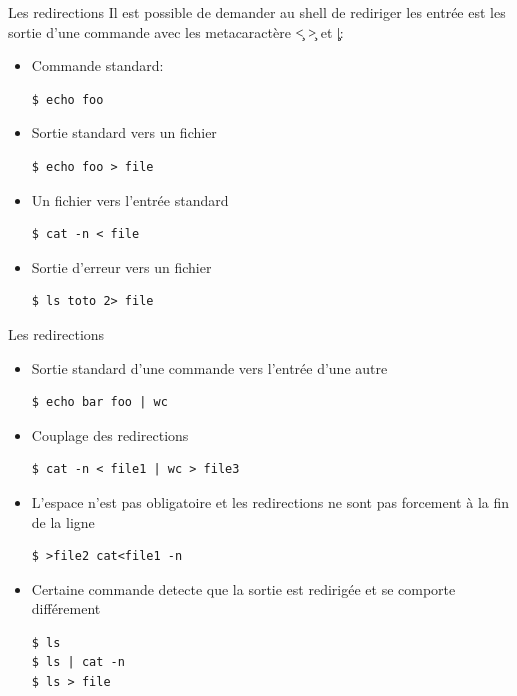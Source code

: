 \begin{frame}[fragile=singleslide]{Les redirections}
  Il est possible de demander au shell de rediriger les entrée est les
  sortie d'une commande avec les metacaractère \c{<} \c{>} et \c{|}:
  \begin{itemize}
  \item Commande standard:
    \begin{lstlisting}
$ echo foo
    \end{lstlisting}
  \item Sortie standard vers un fichier
    \begin{lstlisting}
$ echo foo > file
    \end{lstlisting}
  \item Un fichier vers l'entrée standard
    \begin{lstlisting}
$ cat -n < file
    \end{lstlisting} %
  \item Sortie d'erreur vers un fichier
    \begin{lstlisting}
$ ls toto 2> file
    \end{lstlisting} %
  \end{itemize}
\end{frame}

\begin{frame}[fragile=singleslide]{Les redirections}
  \begin{itemize}
  \item Sortie standard d'une commande vers l'entrée d'une autre
    \begin{lstlisting}
$ echo bar foo | wc
    \end{lstlisting}
  \item Couplage des redirections
    \begin{lstlisting}
$ cat -n < file1 | wc > file3
    \end{lstlisting} %
  \item L'espace n'est pas obligatoire et les redirections ne sont pas
    forcement à la fin de la ligne
    \begin{lstlisting}
$ >file2 cat<file1 -n
    \end{lstlisting} %
  \item Certaine commande detecte que la sortie est redirigée et se
    comporte différement
    \begin{lstlisting}
$ ls
$ ls | cat -n
$ ls > file
    \end{lstlisting}
  \end{itemize}
\end{frame}

